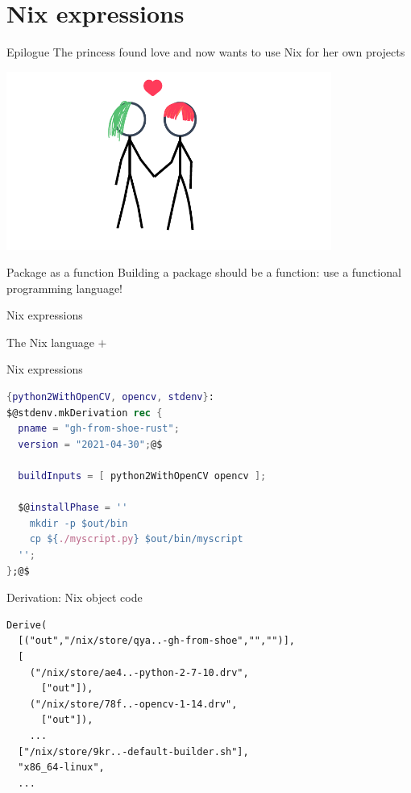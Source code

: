 \documentclass[aspectratio=169]{beamer}
\newcommand{\couleur}[2]{{\color{#1}{#2}}}
\begin{document}
\section{Nix expressions}

\begin{frame}{Epilogue}
    The princess found love and now wants to use Nix for her own projects 
\begin{center}
\includegraphics[width=0.8\textwidth]{img/princess-comics-love.pdf}
\end{center}
\end{frame}

\begin{frame}{Package as a function}
   Building a package should be a \couleur{blue-portage}{pure} function:
   use a functional programming language!
\end{frame}

\begin{frame}{Nix expressions}
\begin{block}{The Nix language}
    \couleur{blue-portage}{JSON} $+$
    \couleur{pink-froly}{$\lambda$ (higher-order functions)}
\end{block}
\end{frame}

\begin{frame}[fragile]{Nix expressions}
\begin{lstlisting}[language=Nix,title={gh-from-shoe/default.nix}]
{python2WithOpenCV, opencv, stdenv}:
$@stdenv.mkDerivation rec {
  pname = "gh-from-shoe-rust";
  version = "2021-04-30";@$

  buildInputs = [ python2WithOpenCV opencv ];

  $@installPhase = ''
    mkdir -p $out/bin
    cp ${./myscript.py} $out/bin/myscript
  '';
};@$
\end{lstlisting}
\end{frame}

\begin{frame}[fragile]{Derivation: Nix object code}
\begin{lstlisting}[title={/nix/store/27az7...gh-from-shoe-1-0.drv}]
Derive(
  [("out","/nix/store/qya..-gh-from-shoe","","")],
  [
    ("/nix/store/ae4..-python-2-7-10.drv",
      ["out"]),
    ("/nix/store/78f..-opencv-1-14.drv",
      ["out"]),
    ...
  ["/nix/store/9kr..-default-builder.sh"],
  "x86_64-linux",
  ...
\end{lstlisting}
\end{frame}
\end{document}
